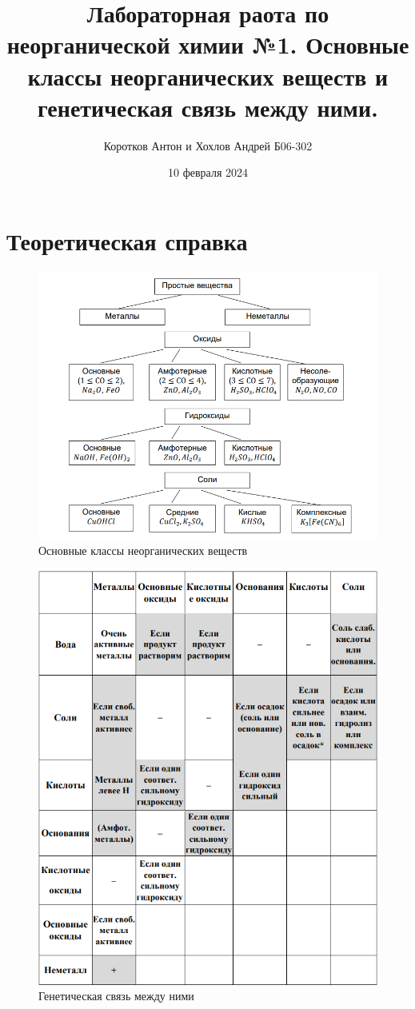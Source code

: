 \documentclass[a4paper, 12pt]{article}
\title{\textbf{Лабораторная раота по неорганической химии №1. Основные классы неорганических веществ и генетическая связь между ними.}}
\author{Коротков Антон и Хохлов Андрей Б06-302}
\date{10 февраля 2024}
\begin{document}
	
	\maketitle
	
	\section{Теоретическая справка}
    \begin{figure}[h]

\centering

\includegraphics[width=0.8\linewidth]{2024-02-10_16-29-39.png}

\caption{Основные классы неорганических веществ}

\label{fig:mpr}

\end{figure}
\begin{figure}[H]
    \centering
    \includegraphics[width=0.8\linewidth]{2024-02-10_16-32-14.png}
    \caption{Генетическая связь между ними}
    \label{fig:enter-label}
\end{figure}
\end{document}

